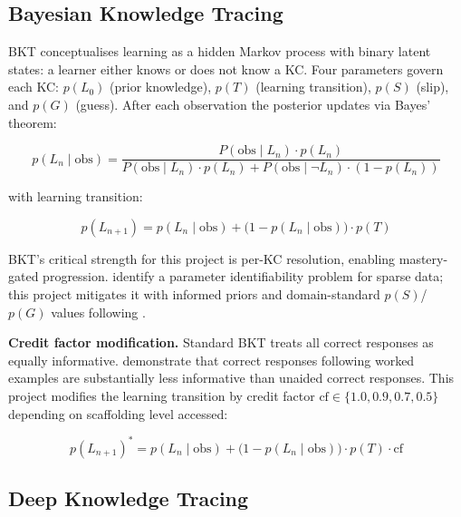 \subsection{Bayesian Knowledge Tracing}
\label{subsec:lr_bkt}

BKT \parencite{corbett1995} conceptualises learning as a hidden Markov process
with binary latent states: a learner either knows or does not know a KC.
Four parameters govern each KC: $p(L_0)$ (prior knowledge), $p(T)$ (learning
transition), $p(S)$ (slip), and $p(G)$ (guess). After each observation the
posterior updates via Bayes' theorem:

\begin{equation}
  p(L_n \mid \text{obs}) = \frac{P(\text{obs} \mid L_n) \cdot p(L_n)}{P(\text{obs} \mid L_n) \cdot p(L_n) + P(\text{obs} \mid \neg L_n) \cdot (1 - p(L_n))}
  \label{eq:bkt_update}
\end{equation}

with learning transition:

\begin{equation}
  p(L_{n+1}) = p(L_n \mid \text{obs}) + \bigl(1 - p(L_n \mid \text{obs})\bigr) \cdot p(T)
  \label{eq:bkt_transition}
\end{equation}

BKT's critical strength for this project is per-KC resolution, enabling
mastery-gated progression. \textcite{beck2007} identify a parameter
identifiability problem for sparse data; this project mitigates it with
informed priors and domain-standard $p(S)$/$p(G)$ values following
\textcite{pardos2011}.

\textbf{Credit factor modification.} Standard BKT treats all correct responses
as equally informative. \textcite{koedinger2007} demonstrate that correct
responses following worked examples are substantially less informative than
unaided correct responses. This project modifies the learning transition by
credit factor $\text{cf} \in \{1.0, 0.9, 0.7, 0.5\}$ depending on scaffolding
level accessed:

\begin{equation}
  p(L_{n+1})^* = p(L_n \mid \text{obs}) + \bigl(1 - p(L_n \mid \text{obs})\bigr) \cdot p(T) \cdot \text{cf}
  \label{eq:bkt_credit}
\end{equation}

\subsection{Deep Knowledge Tracing}
\label{subsec:lr_dkt}

